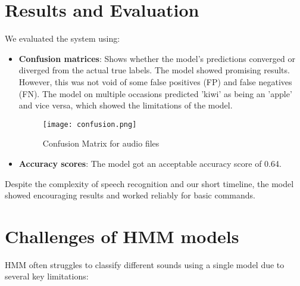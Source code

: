 \documentclass{article}
\begin{document}
\section{Results and Evaluation}
    
    We evaluated the system using:
    \begin{itemize}
        \item \textbf{Confusion matrices}:  Shows whether the model's predictions converged or diverged from the actual true labels.
        The model showed promising results. However, this was not void of some false positives (FP) and false negatives (FN). The model on multiple occasions predicted 'kiwi' as being an 'apple' and vice versa, which showed the limitations of the model.

        \begin{figure}[h!]
            \centering
            \texttt{[image: confusion.png]}
            \caption{Confusion Matrix for audio files}
            \label{fig:enter-label}
        \end{figure}
        
        \item \textbf{Accuracy scores}: The model got an acceptable accuracy score of 0.64.
    \end{itemize}
    
    Despite the complexity of speech recognition and our short timeline, the model showed encouraging results and worked reliably for basic commands.
    
    \section*{Challenges of HMM models}
     
    HMM often struggles to classify different sounds using a single model due to several key limitations:
    
\end{document}
